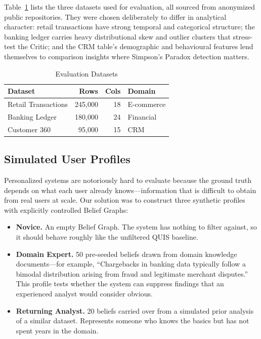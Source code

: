 \documentclass[conference]{IEEEtran}
\begin{document}
Table~\ref{tab:datasets} lists the three datasets used for evaluation,
all sourced from anonymized public repositories. They were chosen
deliberately to differ in analytical character: retail transactions
have strong temporal and categorical structure; the banking ledger
carries heavy distributional skew and outlier clusters that stress-test
the Critic; and the CRM table's demographic and behavioural features
lend themselves to comparison insights where Simpson's Paradox
detection matters.

\begin{table}[htbp]
  \centering
  \caption{Evaluation Datasets}
  \label{tab:datasets}
  \begin{tabular}{@{}lrrl@{}}
    \toprule
    \textbf{Dataset} & \textbf{Rows} & \textbf{Cols} & \textbf{Domain} \\
    \midrule
    Retail Transactions & 245{,}000 & 18 & E-commerce \\
    Banking Ledger      & 180{,}000 & 24 & Financial   \\
    Customer 360        &  95{,}000 & 15 & CRM         \\
    \bottomrule
  \end{tabular}
\end{table}

\subsection{Simulated User Profiles}

Personalized systems are notoriously hard to evaluate because the
ground truth depends on what each user already knows---information
that is difficult to obtain from real users at scale. Our solution
was to construct three synthetic profiles with explicitly controlled
Belief Graphs:

\begin{itemize}
  \item \textbf{Novice.} An empty Belief Graph. The system has nothing
  to filter against, so it should behave roughly like the unfiltered
  QUIS baseline.

  \item \textbf{Domain Expert.} 50 pre-seeded beliefs drawn from
  domain knowledge documents---for example, ``Chargebacks in banking
  data typically follow a bimodal distribution arising from
  fraud and legitimate merchant disputes.'' This profile tests
  whether the system can suppress findings that an experienced
  analyst would consider obvious.

  \item \textbf{Returning Analyst.} 20 beliefs carried over from
  a simulated prior analysis of a similar dataset. Represents
  someone who knows the basics but has not spent years in the domain.
\end{itemize}
\end{document}
